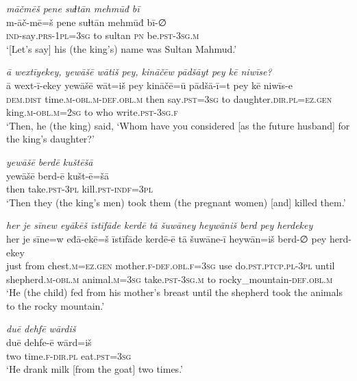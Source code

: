 \ea \label{KŠ.14}
\textit{māčmēš pene suɫtān mehmūđ bī} \\ 
\gll m-āč-mē=š pene suɫtān mehmūđ bī-∅ \\ 
 \textsc{ind-}say\textsc{.prs}\textsc{-\textsc{1pl}}\textsc{=3sg} to sultan \textsc{pn} be\textsc{.pst}\textsc{-3sg}\textsc{.m} \\ 
\glt `[Let’s say] his (the king's) name was Sultan Mahmud.'
\z 
 
\ea \label{KŠ.15}
\textit{ā wextīyekey, yewāšē wātiš pey, kināčēw pādšāyt pey kē niwīse?} \\ 
\gll ā wext-ī-ekey yewāšē wāt=iš pey kināčē=ū pādšā-ī=t pey kē niwīs-e \\ 
 \textsc{dem.dist} time\textsc{.m}\textsc{-obl}\textsc{.m}\textsc{-def}\textsc{.obl}\textsc{.m} then say\textsc{.pst}\textsc{=3sg} to daughter\textsc{.dir}\textsc{.pl}\textsc{=ez.gen} king\textsc{.m}\textsc{-obl}\textsc{.m}\textsc{=\textsc{2sg}} to who write\textsc{.pst}\textsc{-3sg}\textsc{.f} \\ 
\glt `Then, he (the king) said, ‘Whom have you considered [as the future husband] for the king’s daughter?'
\z 
 
\ea \label{KŠ.19}
\textit{yewāšē berdē kuštēšā} \\ 
\gll yewāšē berd-ē kušt-ē=šā \\ 
 then take\textsc{.pst}\textsc{-3pl} kill\textsc{.pst}\textsc{-indf}\textsc{=3pl} \\ 
\glt `Then they (the king’s men) took them (the pregnant women) [and] killed them.'
\z 
 
\ea \label{KŠ.24}
\textit{her je sīnew eyākēš īstīfāde kerdē tā šuwāney heywāniš berd pey herdekey} \\ 
\gll her je sīne=w eđā-ekē=š īstīfāde kerdē-ē tā šuwāne-ī heywān=iš berd-∅ pey herd-ekey \\ 
 just from chest\textsc{.m}\textsc{=ez.gen} mother\textsc{.f}\textsc{-def}\textsc{.obl}\textsc{.f}\textsc{=3sg} use do\textsc{.pst}\textsc{.ptcp}\textsc{.pl}\textsc{-3pl} until shepherd\textsc{.m}\textsc{-obl}\textsc{.m} animal\textsc{.m}\textsc{=3sg} take\textsc{.pst}\textsc{-3sg}\textsc{.m} to rocky\_mountain\textsc{-def}\textsc{.obl}\textsc{.m} \\ 
\glt `He (the child) fed from his mother’s breast until the shepherd took the animals to the rocky mountain.'
\z 
 
\ea \label{KŠ.26}
\textit{duē dehfē wārdiš} \\ 
\gll duē dehfe-ē wārd=iš \\ 
 two time\textsc{.f}\textsc{-dir}\textsc{.pl} eat\textsc{.pst}\textsc{=3sg} \\ 
\glt `He drank milk [from the goat] two times.'
\z 
 
